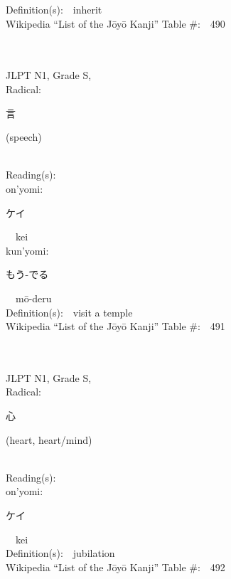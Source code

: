 \begin{multicols}{2}
Definition(s):\ \ inherit \\
Wikipedia ``List of the J\=oy\=o Kanji'' Table \#:\ \ 490 \\
\ \ \\
{\fontsize{34pt}{40pt}  }\ \ \\
{JLPT N1, Grade S, \\Radical:\ \ {\begin{CJK}{UTF8}{min} 言 \end{CJK}} (speech) } \\
Reading(s):\ \ \\
{\hspace*{1em}}on'yomi:\ \ \\
{\hspace*{2em}}{\begin{CJK}{UTF8}{min} ケイ \end{CJK}}\ \ kei\ \ \\
{\hspace*{1em}}kun'yomi:\ \ \\
{\hspace*{2em}}{\begin{CJK}{UTF8}{min} もう-でる \end{CJK}}\ \ m\=o-deru\ \ \\
Definition(s):\ \ visit a temple \\
Wikipedia ``List of the J\=oy\=o Kanji'' Table \#:\ \ 491 \\
\ \ \\
{\fontsize{34pt}{40pt}  }\ \ \\
{JLPT N1, Grade S, \\Radical:\ \ {\begin{CJK}{UTF8}{min} 心 \end{CJK}} (heart, heart/mind) } \\
Reading(s):\ \ \\
{\hspace*{1em}}on'yomi:\ \ \\
{\hspace*{2em}}{\begin{CJK}{UTF8}{min} ケイ \end{CJK}}\ \ kei\ \ \\
Definition(s):\ \ jubilation \\
Wikipedia ``List of the J\=oy\=o Kanji'' Table \#:\ \ 492 \\

\end{multicols}
